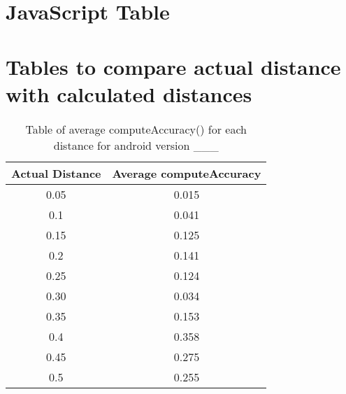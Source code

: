 \section{JavaScript Table}

\section{Tables to compare actual distance with calculated distances}
\begin{table}[H]
\label{tableOfComputeAccuracyOldAndroid}
\begin{tabular}{|c|c|}
\hline 
Actual Distance & Average computeAccuracy\tabularnewline
\hline 
\hline 
0.05 & 0.015\tabularnewline
\hline 
0.1 & 0.041\tabularnewline
\hline 
0.15 & 0.125\tabularnewline
\hline 
0.2 & 0.141\tabularnewline
\hline 
0.25 & 0.124\tabularnewline
\hline 
0.30 & 0.034\tabularnewline
\hline 
0.35 & 0.153\tabularnewline
\hline 
0.4 & 0.358\tabularnewline
\hline 
0.45 & 0.275\tabularnewline
\hline 
0.5 & 0.255\tabularnewline
\hline 
\end{tabular}

\protect\caption{Table of average computeAccuracy() for each distance for android version
\_\_\_}
\end{table}


